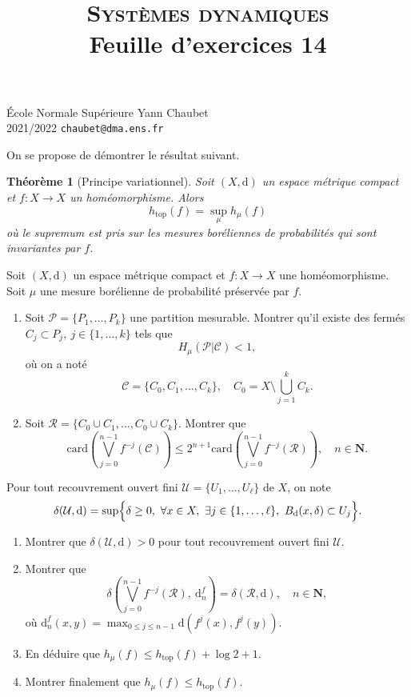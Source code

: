 \documentclass[a4paper,12pt,openany]{article}
\title{\textsc{Syst\`emes dynamiques} \\ Feuille d'exercices 14}
\date{}
\author{}
\theoremstyle{plain}
\newtheorem*{thm*}{Th\'eor\`eme}
\theoremstyle{definition}
\newcommand{\dd}{\mathrm{d}}
\newcommand{\N}{\mathbf{N}}
\begin{document}
{\noindent \'Ecole Normale Sup\'erieure  \hfill Yann Chaubet } \\
{2021/2022 \hfill \texttt{chaubet@dma.ens.fr}}

{\let\newpage\relax\maketitle}
\maketitle


{\noindent On se propose de d\'emontrer le r\'esultat suivant.

\begin{thm*}[Principe variationnel]
Soit $(X, \dd)$ un espace m\'etrique compact et $f : X \to X$ un hom\'eomorphisme. Alors 
$$
h_\mathrm{top}(f) = \sup_\mu h_\mu(f)
$$
o\`u le supremum est pris sur les mesures bor\'eliennes de probabilit\'es qui sont invariantes par $f$.
\end{thm*}
 }
 \vspace{0.6cm}

 \vspace{1.5mm}

\noindent Soit $(X, \dd)$ un espace m\'etrique compact et $f : X \to X$ une hom\'eomorphisme. Soit $\mu$ une mesure bor\'elienne de probabilit\'e pr\'eserv\'ee par $f$. 

\begin{enumerate}
\item Soit $\mathcal{P} = \{P_1, \dots, P_k\}$ une partition mesurable. Montrer qu'il existe des ferm\'es $C_j \subset P_j,~j \in \{1,\dots,k\}$ tels que
$$
H_\mu(\mathcal{P}| \mathcal{C}) < 1,
$$
o\`u on a not\'e
$$
\mathcal{C} = \{C_0, C_1, \dots, C_k\}, \quad C_0 = X \setminus \bigcup_{j=1}^k C_k.
$$
\item Soit $\mathcal{R} = \{C_0 \cup C_1, \dots, C_0 \cup C_k\}$. Montrer que 
$$
\mathrm{card}\left( \bigvee_{j=0}^{n-1} f^{-j}(\mathcal{C})\right) \leq 2^{n+1} \mathrm{card}\left(\bigvee_{j=0}^{n-1} f^{-j}(\mathcal{R})\right), \quad n \in \N.
$$
\end{enumerate}
Pour tout recouvrement ouvert fini $\mathcal{U} = \{U_1, \dots, U_\ell\}$ de $X$, on note
$$
\delta(\mathcal{U}, \dd) = \sup \Bigl\{ \delta \geq 0,~\forall x \in X,~\exists j \in \{1, \dots, \ell\},~B_\dd(x, \delta) \subset U_j \Bigr\}. 
$$
\begin{enumerate}[resume]
\item Montrer que $\delta(\mathcal{U}, \dd) > 0$ pour tout recouvrement ouvert fini $\mathcal{U}$.
\item Montrer que
$$
\delta\left(\bigvee_{j=0}^{n-1} f^{-j}(\mathcal{R}),~ \dd_n^f\right) = \delta(\mathcal{R}, \dd), \quad n \in \N,
$$
o\`u $\dd_n^f(x,y) = \max_{0 \leq j \leq n-1} \dd(f^j(x), f^j(y))$.
\item En d\'eduire que $h_\mu(f) \leq h_\mathrm{top}(f) + \log 2 + 1$.
\item Montrer finalement que $h_\mu(f) \leqslant h_\mathrm{top}(f).$
\end{enumerate}
\end{document}
